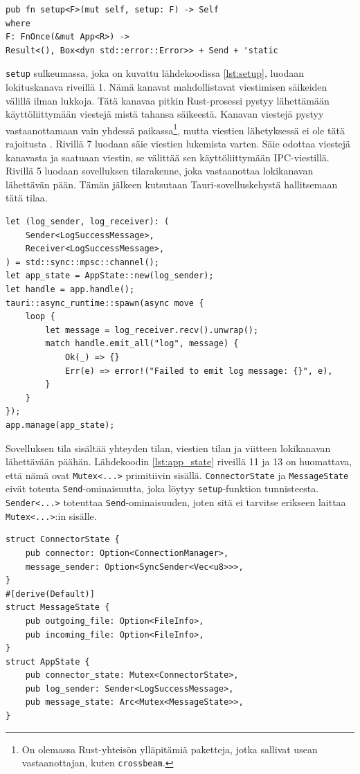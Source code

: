 \documentclass[a4paper,12pt]{article}
\begin{document}
    \begin{lstlisting}[caption={Setup-funktion tunniste}, label={lst:setup_signature}]
pub fn setup<F>(mut self, setup: F) -> Self
where
F: FnOnce(&mut App<R>) ->
Result<(), Box<dyn std::error::Error>> + Send + 'static
    \end{lstlisting}


    \lstinline{setup} sulkeumassa, joka on kuvattu lähdekoodissa \ref{lst:setup}, luodaan lokituskanava riveillä 1. Nämä kanavat mahdollistavat viestimisen säikeiden välillä ilman lukkoja. Tätä kanavaa pitkin Rust-prosessi pystyy lähettämään käyttöliittymään viestejä mistä tahansa säikeestä. Kanavan viestejä pystyy vastaanottamaan vain yhdessä paikassa\footnote{On olemassa Rust-yhteisön ylläpitämiä paketteja, jotka sallivat usean vastaanottajan, kuten \lstinline{crossbeam}.}, mutta viestien lähetyksessä ei ole tätä rajoitusta \cite[ch. 16.2]{rust-book}. Rivillä 7 luodaan säie viestien lukemista varten. Säie odottaa viestejä kanavasta ja saatuaan viestin, se välittää sen käyttöliittymään IPC-viestillä. Rivillä 5 luodaan sovelluksen tilarakenne, joka vastaanottaa lokikanavan lähettävän pään. Tämän jälkeen kutsutaan Tauri-sovelluskehystä hallitsemaan tätä tilaa.
    
    \begin{lstlisting}[caption={setup-sulkeuma}, label={lst:setup}]
let (log_sender, log_receiver): (
    Sender<LogSuccessMessage>,
    Receiver<LogSuccessMessage>,
) = std::sync::mpsc::channel();
let app_state = AppState::new(log_sender);
let handle = app.handle();
tauri::async_runtime::spawn(async move {
    loop {
        let message = log_receiver.recv().unwrap();
        match handle.emit_all("log", message) {
            Ok(_) => {}
            Err(e) => error!("Failed to emit log message: {}", e),
        }
    }
});
app.manage(app_state);\end{lstlisting}

    Sovelluksen tila sisältää yhteyden tilan, viestien tilan ja viitteen lokikanavan lähettävään päähän. Lähdekoodin \ref{lst:app_state} riveillä 11 ja 13 on huomattava, että nämä ovat \lstinline{Mutex<...>} primitiivin sisällä. \lstinline{ConnectorState} ja \lstinline{MessageState} eivät toteuta \lstinline{Send}-ominaisuutta, joka löytyy \lstinline{setup}-funktion tunnisteesta. \lstinline{Sender<...>} toteuttaa \lstinline{Send}-ominaisuuden, joten sitä ei tarvitse erikseen laittaa \lstinline{Mutex<...>}:in sisälle.

    
    \begin{lstlisting}[caption={Sovelluksen tilan rakenne}, label={lst:app_state}]
struct ConnectorState {
    pub connector: Option<ConnectionManager>,
    message_sender: Option<SyncSender<Vec<u8>>>,
}
#[derive(Default)]
struct MessageState {
    pub outgoing_file: Option<FileInfo>,
    pub incoming_file: Option<FileInfo>,
}
struct AppState {
    pub connector_state: Mutex<ConnectorState>,
    pub log_sender: Sender<LogSuccessMessage>,
    pub message_state: Arc<Mutex<MessageState>>,
}\end{lstlisting}
\end{document}
